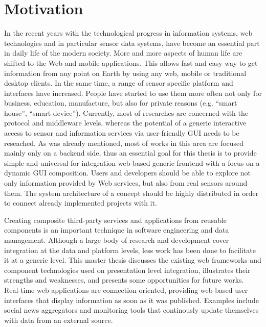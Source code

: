 \section{Motivation}
     In the recent years with the technological progress in information systems, web technologies and in particular sensor data systems, have become an essential part in daily life of the modern society. More and more aspects of human life are shifted to the Web and mobile applications. This allows fast and easy way to get information from any point on Earth by using any web, mobile or traditional desktop clients. In the same time, a range of sensor specific platform and interfaces have increased. People have started to use them more often not only for business, education, manufacture, but also for private reasons (e.g. ``smart house'', ``smart device''). Currently, most of researches are concerned with the protocol and middleware levels, whereas the potential of a generic interactive access to sensor and information services via user-friendly GUI  needs to be reseached. As was already mentioned, most of works in this area are focused mainly only on a backend side, thus an essential goal for this thesis is to provide simple and universal for integration web-based generic frontend with a focus on a dynamic GUI composition. Users and developers should be able to explore not only information provided by Web services, but also from real sensors around them. The system architecture of a concept should be highly distributed in order to connect already implemented projects with it.

     Creating composite third-party services and applications from reusable components is an important technique in software engineering and data management. Although a large body of research and development cover integration at the data and platform levels, less work has been done to facilitate it at a generic level. This master thesis discusses the existing web frameworks and component technologies used on presentation level integration, illustrates their strengths and weaknesses, and presents some opportunities for future works. Real-time web applications are connection-oriented, providing web-based user interfaces that display information as soon as it was published. Examples include social news aggregators and monitoring tools that continously update themselves with data from an external source.

